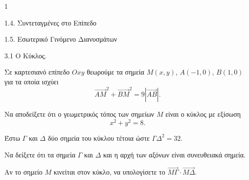 \begin{ylh}{1}
    \item 1.4. Συντεταγμένες στο Επίπεδο
    \item 1.5. Εσωτερικό Γινόμενο Διανυσμάτων
    \item 3.1 Ο Κύκλος.
\end{ylh}
Σε καρτεσιανό επίπεδο $Oxy$ θεωρούμε τα σημεία $M(x,y)$, $A(-1,0)$, $B(1,0)$ για τα οποία ισχύει
\[ \vec{AM}^2 + \vec{BM}^2 = 9|\vec{AB}|. \]
\begin{alist}
\item Να αποδείξετε ότι ο γεωμετρικός τόπος των σημείων $M$ είναι ο κύκλος με εξίσωση
\[ x^2 + y^2 = 8. \] 
\item Έστω $\Gamma$ και $\Delta$ δύο σημεία του κύκλου τέτοια ώστε $\Gamma\Delta^2 = 32$.
    \begin{rlist}
    \item Να δείξετε ότι τα σημεία $\Gamma$ και $\Delta$ και η αρχή των αξόνων είναι συνευθειακά σημεία. 
    \item Αν το σημείο $M$ κινείται στον κύκλο, να υπολογίσετε το $\vec{M\Gamma} \cdot \vec{M\Delta}$. 
    \end{rlist}
\end{alist}